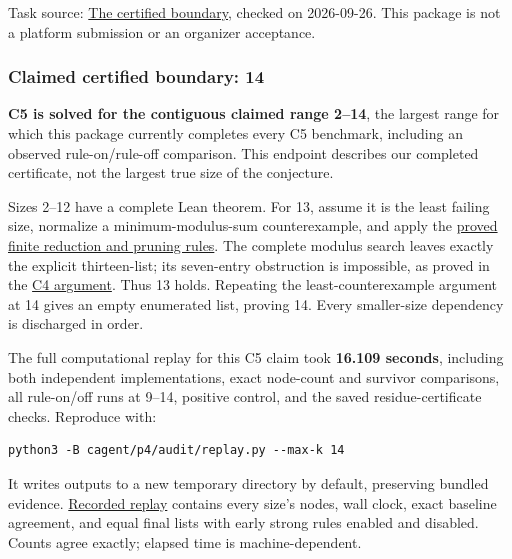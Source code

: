 \documentclass[11pt,a4paper]{article}
\begin{document}
Task source: \href{https://hackathon.bainsa.ai/p/p4/c5}{The certified boundary}, checked on 2026-09-26. This package is not a platform submission or an organizer acceptance.

\subsubsection{Claimed certified boundary: 14}\label{claimed-certified-boundary-14}

\textbf{C5 is solved for the contiguous claimed range 2--14}, the largest range for which this package currently completes every C5 benchmark, including an observed rule-on/rule-off comparison. This endpoint describes our completed certificate, not the largest true size of the conjecture.

Sizes 2--12 have a complete Lean theorem. For 13, assume it is the least failing size, normalize a minimum-modulus-sum counterexample, and apply the \href{https://github.com/mpelteshki/climbing-to-the-frontier/blob/ed55f76eb8c558825bb629fd2cd8dbf46e5f1314/cagent/p4/audit/reduction-proof.md}{proved finite reduction and pruning rules}. The complete modulus search leaves exactly the explicit thirteen-list; its seven-entry obstruction is impossible, as proved in the \href{https://github.com/mpelteshki/climbing-to-the-frontier/blob/ed55f76eb8c558825bb629fd2cd8dbf46e5f1314/cagent/p4/c4/solution.md}{C4 argument}. Thus 13 holds. Repeating the least-counterexample argument at 14 gives an empty enumerated list, proving 14. Every smaller-size dependency is discharged in order.

The full computational replay for this C5 claim took \textbf{16.109 seconds}, including both independent implementations, exact node-count and survivor comparisons, all rule-on/off runs at 9--14, positive control, and the saved residue-certificate checks. Reproduce with:

\begin{Verbatim}[breaklines,breakanywhere,fontsize=\footnotesize]
python3 -B cagent/p4/audit/replay.py --max-k 14
\end{Verbatim}

It writes outputs to a new temporary directory by default, preserving bundled evidence. \href{https://github.com/mpelteshki/climbing-to-the-frontier/blob/ed55f76eb8c558825bb629fd2cd8dbf46e5f1314/cagent/p4/audit/replay-evidence-9-14.json}{Recorded replay} contains every size's nodes, wall clock, exact baseline agreement, and equal final lists with early strong rules enabled and disabled. Counts agree exactly; elapsed time is machine-dependent.
\end{document}
